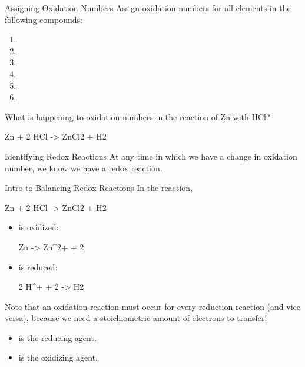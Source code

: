 \documentclass[11pt,letterpaper]{article}
\begin{document}
\begin{frame}[t]{Assigning Oxidation Numbers}
	Assign oxidation numbers for all elements in the following compounds:

	\begin{multicols}{2}
	\begin{enumerate}
		\item {}
		\item {}
		\item {}
		\item {}
		\item {}
		\item {}
	\end{enumerate}
	\end{multicols}

	\pause

	What is happening to oxidation numbers in the reaction of Zn with HCl?
	\begin{reaction*}
		Zn\sld{} + 2 HCl\aq{} -> ZnCl2\aq{} + H2\gas{}
	\end{reaction*}

	\pause

	\begin{block}{Identifying Redox Reactions}
		At \alert{any} time in which we have a \alert{change} in oxidation
		number, we know we have a \alert{redox} reaction.
	\end{block}
\end{frame}


\begin{frame}{Intro to Balancing Redox Reactions}
	In the reaction,
	\begin{reaction*}
		Zn\sld{} + 2 HCl\aq{} -> ZnCl2\aq{} + H2\gas{}
	\end{reaction*}

	\begin{itemize}
		\item {} is \alert{oxidized}:
			\begin{reaction*}
				Zn\sld{} -> Zn^{2+}\aq{} + 2 \el{}
			\end{reaction*}
		\item {} is \alert{reduced}:
			\begin{reaction*}
				2 H^{+}\aq{} + 2 \el{} -> H2\gas{}
			\end{reaction*}
	\end{itemize}

	\pause

	Note that an oxidation reaction \alert{must} occur for every reduction
	reaction (and vice versa), because we need a \alert{stoichiometric}
	amount of electrons to \alert{transfer}!
	\begin{itemize}
		\item {} is the \alert{reducing agent}.
		\item {} is the \alert{oxidizing agent}.
	\end{itemize}
\end{frame}
\end{document}
